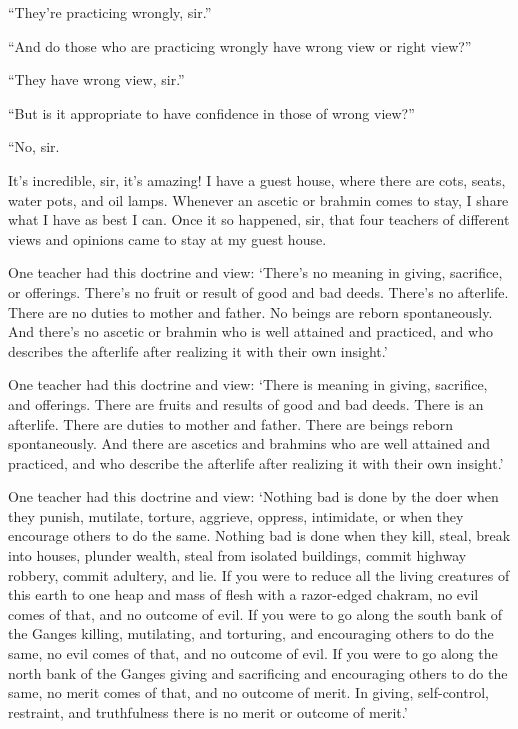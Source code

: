 \documentclass[12pt,openany]{book}%
\begin{document}
“They’re practicing wrongly, sir.” 

“And do those who are practicing wrongly have wrong view or right view?” 

“They have wrong view, sir.” 

“But is it appropriate to have confidence in those of wrong view?” 

“No, sir. 

It’s incredible, sir, it’s amazing! I have a guest house, where there are cots, seats, water pots, and oil lamps. Whenever an ascetic or brahmin comes to stay, I share what I have as best I can. Once it so happened, sir, that four teachers of different views and opinions came to stay at my guest house. 

One teacher had this doctrine and view: ‘There’s no meaning in giving, sacrifice, or offerings. There’s no fruit or result of good and bad deeds. There’s no afterlife. There are no duties to mother and father. No beings are reborn spontaneously. And there’s no ascetic or brahmin who is well attained and practiced, and who describes the afterlife after realizing it with their own insight.’ 

One teacher had this doctrine and view: ‘There is meaning in giving, sacrifice, and offerings. There are fruits and results of good and bad deeds. There is an afterlife. There are duties to mother and father. There are beings reborn spontaneously. And there are ascetics and brahmins who are well attained and practiced, and who describe the afterlife after realizing it with their own insight.’ 

One teacher had this doctrine and view: ‘Nothing bad is done by the doer when they punish, mutilate, torture, aggrieve, oppress, intimidate, or when they encourage others to do the same. Nothing bad is done when they kill, steal, break into houses, plunder wealth, steal from isolated buildings, commit highway robbery, commit adultery, and lie. If you were to reduce all the living creatures of this earth to one heap and mass of flesh with a razor-edged chakram, no evil comes of that, and no outcome of evil. If you were to go along the south bank of the Ganges killing, mutilating, and torturing, and encouraging others to do the same, no evil comes of that, and no outcome of evil. If you were to go along the north bank of the Ganges giving and sacrificing and encouraging others to do the same, no merit comes of that, and no outcome of merit. In giving, self-control, restraint, and truthfulness there is no merit or outcome of merit.’ 
\end{document}
